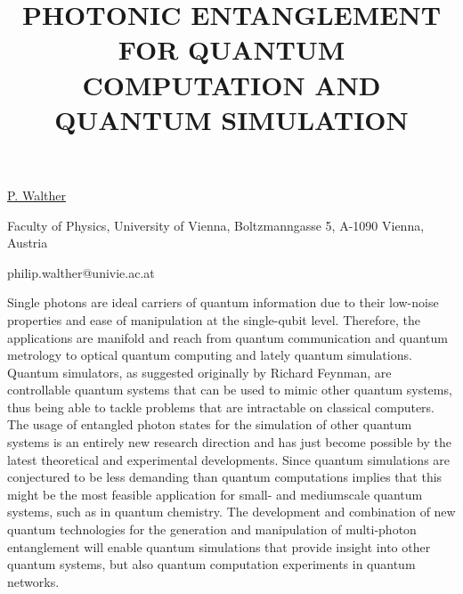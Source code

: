 \title{PHOTONIC ENTANGLEMENT FOR QUANTUM COMPUTATION AND QUANTUM SIMULATION}

\underline{P. Walther}

{\normalsize{

\vspace{-4mm} Faculty of Physics, University of Vienna, Boltzmanngasse 5, A-1090 Vienna, Austria

\email philip.walther@univie.ac.at}}

Single photons are ideal carriers of quantum information due to their low-noise properties and
ease of manipulation at the single-qubit level. Therefore, the applications are manifold and reach
from quantum communication and quantum metrology to optical quantum computing and
lately quantum simulations.
Quantum simulators, as suggested originally by Richard Feynman, are controllable quantum systems that can be used to mimic other quantum systems, thus being able to tackle problems that are intractable on classical computers. The usage of entangled photon states for the simulation of other quantum systems is an entirely new research direction and has just become possible by the latest theoretical and experimental developments. Since quantum simulations are conjectured to be less demanding than quantum computations implies that this might be the most feasible application for small- and mediumscale quantum systems, such as in quantum chemistry.
The development and combination of new quantum technologies for the generation and
manipulation of multi-photon entanglement will enable quantum simulations that provide
insight into other quantum systems, but also quantum computation experiments in quantum
networks.

\vspace{\baselineskip}
